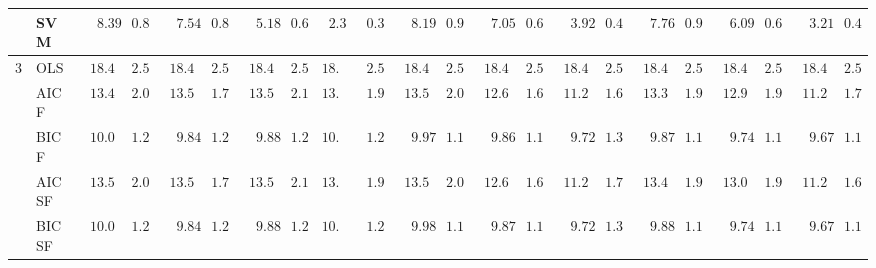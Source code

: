 \begin{tabular}{p{0.2cm}p{1cm}|p{0.6cm}p{0.6cm}|p{0.6cm}p{0.6cm}p{0.6cm}p{0.6cm}p{0.6cm}p{0.6cm}|p{0.6cm}p{0.6cm}p{0.6cm}p{0.6cm}p{0.6cm}p{0.6cm}|p{0.6cm}p{0.6cm}p{0.6cm}p{0.6cm}p{0.6cm}p{0.6cm}}
 & SVM  & $\phantom{00}8.39$ & $\phantom{0}0.84$ & $\phantom{00}7.54$ & $\phantom{0}0.82$ & $\phantom{00}5.18$ & $\phantom{0}0.64$ & $\phantom{0}2.32$ & $\phantom{0}0.34$ & $\phantom{00}8.19$ & $\phantom{0}0.99$ & $\phantom{00}7.05$ & $\phantom{0}0.64$ & $\phantom{00}3.92$ & $\phantom{0}0.48$ & $\phantom{00}7.76$ & $\phantom{0}0.90$ & $\phantom{00}6.09$ & $\phantom{0}0.69$ & $\phantom{00}3.21$ & $\phantom{0}0.45$ \\\hline
3 & OLS  & $\phantom{0}18.46$ & $\phantom{0}2.55$ & $\phantom{0}18.46$ & $\phantom{0}2.55$ & $\phantom{0}18.46$ & $\phantom{0}2.55$ & $18.46$ & $\phantom{0}2.55$ & $\phantom{0}18.46$ & $\phantom{0}2.55$ & $\phantom{0}18.46$ & $\phantom{0}2.55$ & $\phantom{0}18.46$ & $\phantom{0}2.55$ & $\phantom{0}18.46$ & $\phantom{0}2.55$ & $\phantom{0}18.46$ & $\phantom{0}2.55$ & $\phantom{0}18.46$ & $\phantom{0}2.55$ \\
 & AIC F  & $\phantom{0}13.48$ & $\phantom{0}2.06$ & $\phantom{0}13.53$ & $\phantom{0}1.78$ & $\phantom{0}13.50$ & $\phantom{0}2.14$ & $13.51$ & $\phantom{0}1.92$ & $\phantom{0}13.56$ & $\phantom{0}2.06$ & $\phantom{0}12.69$ & $\phantom{0}1.65$ & $\phantom{0}11.26$ & $\phantom{0}1.61$ & $\phantom{0}13.32$ & $\phantom{0}1.90$ & $\phantom{0}12.94$ & $\phantom{0}1.90$ & $\phantom{0}11.23$ & $\phantom{0}1.75$ \\
 & BIC F  & $\phantom{0}10.01$ & $\phantom{0}1.22$ & $\phantom{00}9.84$ & $\phantom{0}1.25$ & $\phantom{00}9.88$ & $\phantom{0}1.21$ & $10.07$ & $\phantom{0}1.24$ & $\phantom{00}9.97$ & $\phantom{0}1.13$ & $\phantom{00}9.86$ & $\phantom{0}1.10$ & $\phantom{00}9.72$ & $\phantom{0}1.32$ & $\phantom{00}9.87$ & $\phantom{0}1.16$ & $\phantom{00}9.74$ & $\phantom{0}1.10$ & $\phantom{00}9.67$ & $\phantom{0}1.15$ \\
 & AIC SF  & $\phantom{0}13.56$ & $\phantom{0}2.04$ & $\phantom{0}13.56$ & $\phantom{0}1.73$ & $\phantom{0}13.54$ & $\phantom{0}2.11$ & $13.55$ & $\phantom{0}1.96$ & $\phantom{0}13.59$ & $\phantom{0}2.06$ & $\phantom{0}12.68$ & $\phantom{0}1.64$ & $\phantom{0}11.25$ & $\phantom{0}1.70$ & $\phantom{0}13.40$ & $\phantom{0}1.98$ & $\phantom{0}13.00$ & $\phantom{0}1.93$ & $\phantom{0}11.20$ & $\phantom{0}1.69$ \\
 & BIC SF  & $\phantom{0}10.00$ & $\phantom{0}1.21$ & $\phantom{00}9.84$ & $\phantom{0}1.24$ & $\phantom{00}9.88$ & $\phantom{0}1.21$ & $10.08$ & $\phantom{0}1.25$ & $\phantom{00}9.98$ & $\phantom{0}1.13$ & $\phantom{00}9.87$ & $\phantom{0}1.10$ & $\phantom{00}9.72$ & $\phantom{0}1.33$ & $\phantom{00}9.88$ & $\phantom{0}1.17$ & $\phantom{00}9.74$ & $\phantom{0}1.11$ & $\phantom{00}9.67$ & $\phantom{0}1.15$ \\

\end{tabular}

